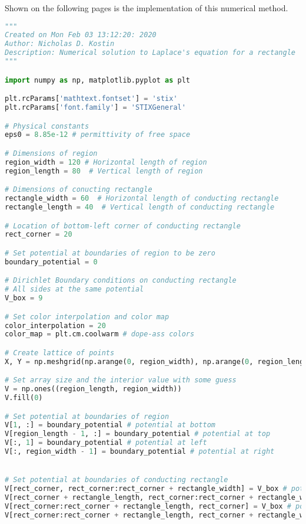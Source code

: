 \documentclass{article}
\begin{document}
Shown on the following pages is the implementation of this numerical method.

% 

\begin{lstlisting}[language=Python]
"""
Created on Mon Feb 03 13:12:20: 2020
Author: Nicholas D. Kostin
Description: Numerical solution to Laplace's equation for a rectangle
"""

import numpy as np, matplotlib.pyplot as plt

plt.rcParams['mathtext.fontset'] = 'stix'
plt.rcParams['font.family'] = 'STIXGeneral'

# Physical constants
eps0 = 8.85e-12 # permittivity of free space

# Dimensions of region
region_width = 120 # Horizontal length of region
region_length = 80  # Vertical length of region

# Dimensions of conucting rectangle
rectangle_width = 60  # Horizontal length of conducting rectangle
rectangle_length = 40  # Vertical length of conducting rectangle

# Location of bottom-left corner of conducting rectangle
rect_corner = 20

# Set potential at boundaries of region to be zero
boundary_potential = 0

# Dirichlet Boundary conditions on conducting rectangle
# All sides at the same potential
V_box = 9

# Set color interpolation and color map
color_interpolation = 20
color_map = plt.cm.coolwarm # dope-ass colors

# Create lattice of points
X, Y = np.meshgrid(np.arange(0, region_width), np.arange(0, region_length))

# Set array size and the interior value with some guess
V = np.ones((region_length, region_width))
V.fill(0)

# Set potential at boundaries of region
V[1, :] = boundary_potential # potential at bottom
V[region_length - 1, :] = boundary_potential # potential at top
V[:, 1] = boundary_potential # potential at left
V[:, region_width - 1] = boundary_potential # potential at right


# Set potential at boundaries of conducting rectangle
V[rect_corner, rect_corner:rect_corner + rectangle_width] = V_box # potential at bottom
V[rect_corner + rectangle_length, rect_corner:rect_corner + rectangle_width] = V_box # potential at top
V[rect_corner:rect_corner + rectangle_length, rect_corner] = V_box # potential at left
V[rect_corner:rect_corner + rectangle_length, rect_corner + rectangle_width] = V_box # potential at right


\end{lstlisting}
\end{document}
